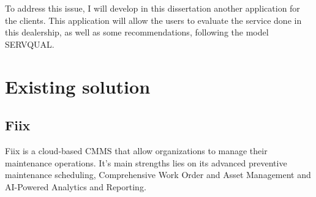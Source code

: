 To address this issue, I will develop in this dissertation another application for the clients. 
This application will allow the users to evaluate the service done in this dealership, as well as some recommendations, following the model SERVQUAL. 











\section{Existing solution}

\subsection{Fiix}
Fiix is a cloud-based \ac{CMMS} that allow organizations to manage their maintenance operations. 
It's main strengths lies on its advanced preventive maintenance scheduling, Comprehensive Work Order and Asset Management and AI-Powered Analytics and Reporting.

